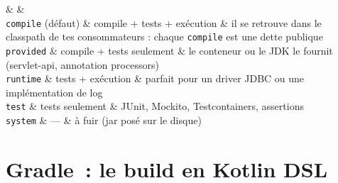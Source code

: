 \begin{tablez}
  \headrow {} \&  \&  \\
  \midrule
  \verb|compile| (d\'efaut) \& compile + tests + ex\'ecution \& il se retrouve dans le classpath de tes consommateurs : chaque \verb|compile| est une dette publique \\
  \verb|provided| \& compile + tests seulement \& le conteneur ou le JDK le fournit (servlet-api, annotation processors) \\
  \verb|runtime| \& tests + ex\'ecution \& parfait pour un driver JDBC ou une impl\'ementation de log \\
  \verb|test| \& tests seulement \& JUnit, Mockito, Testcontainers, assertions \\
  \verb|system| \& --- \& \`a fuir (jar pos\'e sur le disque) \\
\end{tablez}

\section{Gradle~: le build en Kotlin DSL}

